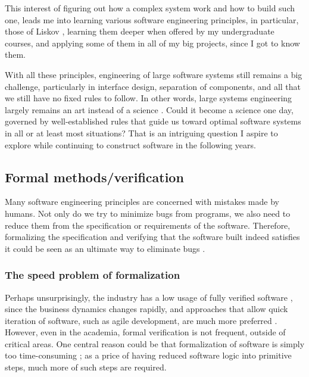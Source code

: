 \documentclass[10pt]{article}
\begin{document}
This interest of figuring out how a complex system work and how to build such
one, leads me into learning various software engineering principles, in
particular, those of Liskov \cite{liskov.adt, liskov.subtype}, learning them
deeper when offered by my undergraduate courses, and applying some of them in
all of my big projects, since I got to know them. 

With all these principles, engineering of large software systems still remains
a big challenge, particularly in interface design, separation of components,
and all that we still have no fixed rules to follow. In other words, large
systems engineering largely remains an art instead of a science
\cite{no.silver.bullet, prospect.eng.discipline.software}. Could it become a
science one day, governed by well-established rules that guide us toward
optimal software systems in all or at least most situations? That is an
intriguing question I aspire to explore while continuing to construct software
in the following years.

\subsection{Formal methods/verification}
Many software engineering principles are concerned with mistakes made by
humans. Not only do we try to minimize bugs from programs, we also need to
reduce them from the specification or requirements of the software.  Therefore,
formalizing the specification and verifying that the software built indeed
satisfies it could be seen as an ultimate way to eliminate bugs
\cite{hoare.axiomatic.prog}. 

\subsubsection{The speed problem of formalization}
Perhaps unsurprisingly, the industry has a low usage of fully verified software
\cite{formal.methods.underuse}, since the business dynamics changes rapidly,
and approaches that allow quick iteration of software, such as agile
development, are much more preferred \cite{agile.se}. However, even in the
academia, formal verification is not frequent, outside of critical areas. One
central reason could be that formalization of software is simply too
time-consuming \cite{formal.methods.underuse}; as a price of having reduced
software logic into primitive steps, much more of such steps are required.
\end{document}
